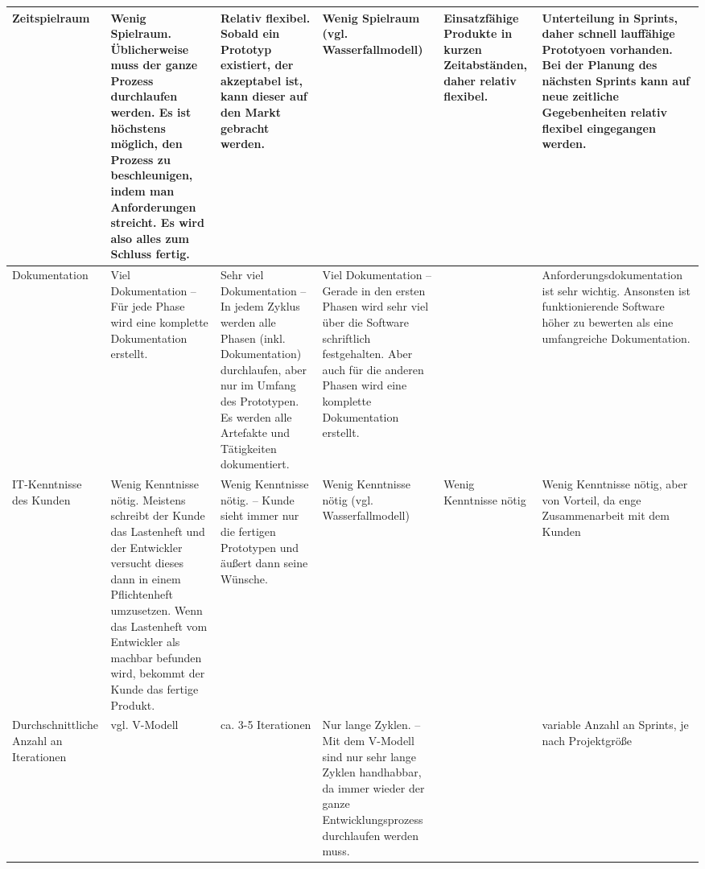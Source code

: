 \documentclass{bschlangaul-aufgabe}
\begin{document}
\begin{liAntwort}
{\begin{tabularx}{\linewidth}{>{\raggedright\arraybackslash}X||>{\raggedright\arraybackslash}X>{\raggedright\arraybackslash}X>{\raggedright\arraybackslash}X>{\raggedright\arraybackslash}X>{\raggedright\arraybackslash}X}
Zeitspielraum &
Wenig Spielraum. Üblicherweise muss der ganze Prozess durchlaufen
werden. Es ist höchstens möglich, den Prozess zu beschleunigen,
indem man Anforderungen streicht. Es wird also alles zum Schluss
fertig. & %
Relativ flexibel. Sobald ein Prototyp existiert, der akzeptabel ist,
kann dieser auf den Markt gebracht werden. & %
Wenig Spielraum (vgl. Wasserfallmodell) & %
Einsatzfähige Produkte in kurzen Zeitabständen, daher relativ
flexibel. & %
Unterteilung in Sprints, daher schnell lauffähige Prototyoen vorhanden.
Bei der Planung des nächsten Sprints kann auf neue zeitliche
Gegebenheiten relativ flexibel eingegangen werden. %
\\\hline

Dokumentation &
Viel Dokumentation – Für jede Phase wird eine komplette Dokumentation
erstellt. & %
Sehr viel Dokumentation – In jedem Zyklus werden alle Phasen
(inkl. Dokumentation) durchlaufen, aber nur im Umfang des
Prototypen. Es werden alle Artefakte und Tätigkeiten dokumentiert.
& %
Viel Dokumentation – Gerade in den ersten Phasen wird sehr viel über
die Software schriftlich festgehalten. Aber auch für die anderen
Phasen wird eine komplette Dokumentation erstellt.
& %
&
Anforderungsdokumentation ist sehr wichtig. Ansonsten ist
funktionierende Software höher zu bewerten als eine umfangreiche
Dokumentation. %
\\\hline

IT-Kenntnisse des Kunden &
Wenig Kenntnisse nötig. Meistens schreibt der Kunde das Lastenheft und
der Entwickler versucht dieses dann in einem Pflichtenheft
umzusetzen. Wenn das Lastenheft vom Entwickler als machbar
befunden wird, bekommt der Kunde das fertige Produkt.
& %
Wenig Kenntnisse nötig. – Kunde sieht immer nur die fertigen Prototypen
und äußert dann seine Wünsche. & %
Wenig Kenntnisse nötig (vgl. Wasserfallmodell) & %
Wenig Kenntnisse nötig & %
Wenig Kenntnisse nötig, aber von Vorteil, da enge Zusammenarbeit mit
dem Kunden %
\\\hline

Durchschnittliche Anzahl an Iterationen &
vgl. V-Modell & %
ca. 3-5 Iterationen & %
Nur lange Zyklen. – Mit dem V-Modell sind nur sehr lange Zyklen
handhabbar, da immer wieder der ganze Entwicklungsprozess durchlaufen
werden muss. & %
& %
variable Anzahl an Sprints, je nach Projektgröße %
\\\hline
\end{tabularx}
}
\end{liAntwort}
\end{document}
